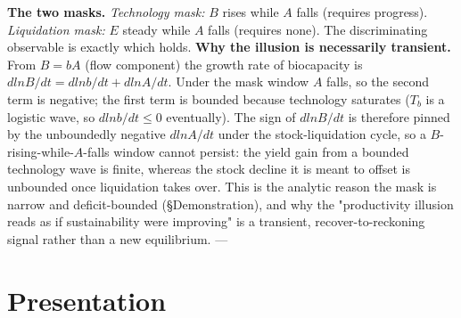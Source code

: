 \documentclass[11pt]{article}
\begin{document}
\textbf{The two masks.} \emph{Technology mask:} $B$ rises while $A$ falls (requires progress). \emph{Liquidation mask:} $E$ steady while $A$ falls (requires none). The discriminating observable is exactly which holds. \textbf{Why the illusion is necessarily transient.} From $B = bA$ (flow component) the growth rate of biocapacity is $d ln B/dt = d ln b/dt + d ln A/dt$. Under the mask window $A$ falls, so the second term is negative; the first term is bounded because technology saturates ($T_{b}$ is a logistic wave, so $d ln b/dt \leq{} 0$ eventually). The sign of $d ln B/dt$ is therefore pinned by the unboundedly negative $d ln A/dt$ under the stock-liquidation cycle, so a $B$-rising-while-$A$-falls window cannot persist: the yield gain from a bounded technology wave is finite, whereas the stock decline it is meant to offset is unbounded once liquidation takes over. This is the analytic reason the mask is narrow and deficit-bounded (§Demonstration), and why the "productivity illusion reads as if sustainability were improving" is a transient, recover-to-reckoning signal rather than a new equilibrium. ---

\section{Presentation}
\end{document}
